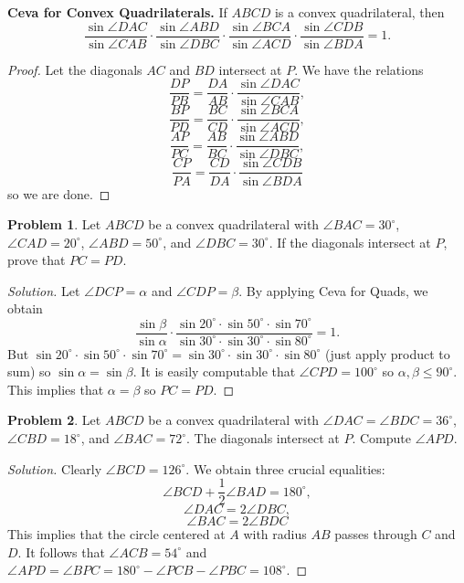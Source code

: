 \documentclass[a4paper]{article}
\theoremstyle{definition}
\newtheorem{problem}{Problem}[subsection]
\begin{document}
\textbf{Ceva for Convex Quadrilaterals.} If $ABCD$ is a convex quadrilateral, then 
\[ \frac{\sin \angle DAC}{\sin \angle CAB} \cdot \frac{\sin \angle ABD}{\sin \angle DBC} \cdot \frac{\sin \angle BCA}{\sin \angle ACD} \cdot \frac{\sin \angle CDB}{\sin \angle BDA} = 1. \]

\begin{proof}
Let the diagonals $AC$ and $BD$ intersect at $P$. We have the relations
\[ \frac{DP}{PB} = \frac{DA}{AB} \cdot \frac{\sin \angle DAC}{\sin \angle CAB}, \]
\[ \frac{BP}{PD} = \frac{BC}{CD} \cdot \frac{\sin \angle BCA}{\sin \angle ACD}, \]
\[ \frac{AP}{PC} = \frac{AB}{BC} \cdot \frac{\sin \angle ABD}{\sin \angle DBC}, \]
\[ \frac{CP}{PA} = \frac{CD}{DA} \cdot \frac{\sin \angle CDB}{\sin \angle BDA} \]
so we are done.
\end{proof}

\begin{problem}
Let $ABCD$ be a convex quadrilateral with $\angle BAC = 30^{\circ}$, $\angle CAD = 20^{\circ}$, $\angle ABD = 50^{\circ}$, and $\angle DBC = 30^{\circ}$. If the diagonals intersect at $P$, prove that $PC = PD$.
\end{problem}

\begin{proof}[Solution]
Let $\angle DCP = \alpha$ and $\angle CDP = \beta$. By applying Ceva for Quads, we obtain
\[ \frac{\sin \beta}{\sin \alpha} \cdot \frac{\sin 20^{\circ} \cdot \sin 50^{\circ} \cdot \sin 70^{\circ}}{\sin 30^{\circ} \cdot \sin 30^{\circ} \cdot \sin 80^{\circ}} = 1. \]
But $\sin 20^{\circ} \cdot \sin 50^{\circ} \cdot \sin 70^{\circ} = \sin 30^{\circ} \cdot \sin 30^{\circ} \cdot \sin 80^{\circ}$ (just apply product to sum) so $\sin \alpha = \sin \beta$. It is easily computable that $\angle CPD = 100^{\circ}$ so $\alpha, \beta \leq 90^{\circ}$. This implies that $\alpha = \beta$ so $PC = PD$.
\end{proof}

\begin{problem}
Let $ABCD$ be a convex quadrilateral with $\angle DAC = \angle BDC = 36^{\circ}$, $\angle CBD = 18^{\circ}$, and $\angle BAC = 72^{\circ}$. The diagonals intersect at $P$. Compute $\angle APD$.
\end{problem}

\begin{proof}[Solution]
Clearly $\angle BCD = 126^{\circ}$. We obtain three crucial equalities:
\[ \angle BCD + \frac{1}{2} \angle BAD = 180^{\circ}, \]
\[ \angle DAC = 2\angle DBC, \]
\[ \angle BAC = 2\angle BDC \]
This implies that the circle centered at $A$ with radius $AB$ passes through $C$ and $D$. It follows that $\angle ACB = 54^{\circ}$ and $\angle APD = \angle BPC = 180^{\circ} - \angle PCB - \angle PBC = 108^{\circ}$.
\end{proof}
\end{document}
